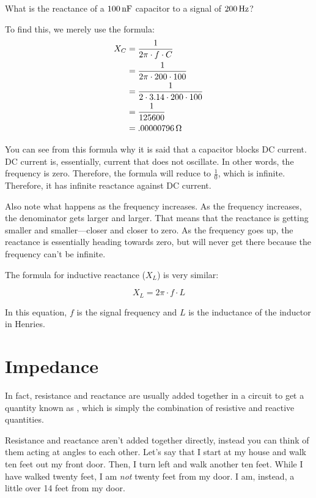 \begin{exampleprob}
What is the reactance of a $100\,\si{\nano\farad}$ capacitor to a signal of $200\,\si{\hertz}$?

To find this, we merely use the formula:
\begin{align*}
X_C &= \frac{1}{2\pi\cdot f\cdot C} \\
 &= \frac{1}{2\pi\cdot 200\cdot 100} \\
 &= \frac{1}{2\cdot 3.14\cdot200\cdot100} \\
 &= \frac{1}{125600} \\
 &= .00000796\,\si{\ohm}
\end{align*}
\end{exampleprob}

You can see from this formula why it is said that a capacitor blocks DC current.
DC current is, essentially, current that does not oscillate.
In other words, the frequency is zero.
Therefore, the formula will reduce to $\frac{1}{0}$, which is infinite.
Therefore, it has infinite reactance against DC current.

Also note what happens as the frequency increases.
As the frequency increases, the denominator gets larger and larger.
That means that the reactance is getting smaller and smaller---closer and closer to zero.
As the frequency goes up, the reactance is essentially heading towards zero, but will never get there because the frequency can't be infinite.

The formula for inductive reactance ($X_L$) is very similar:

\begin{equation}
\label{eqReactanceInductor}
X_L = 2\pi\cdot f\cdot L
\end{equation}

In this equation, $f$ is the signal frequency and $L$ is the inductance of the inductor in Henries.

\section{Impedance}
\label{secImpedance}
In fact, resistance and reactance are usually added together in a circuit to get a quantity known as , which is simply the combination of resistive and reactive quantities.

Resistance and reactance aren't added together directly, instead you can think of them acting at angles to each other.
Let's say that I start at my house and walk ten feet out my front door.
Then, I turn left and walk another ten feet.
While I have walked twenty feet, I am \emph{not} twenty feet from my door.
I am, instead, a little over 14 feet from my door.

